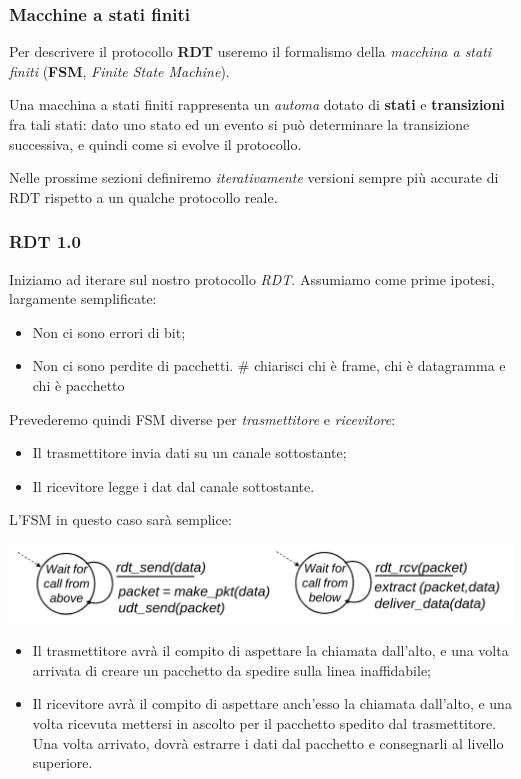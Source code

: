 \documentclass[a4paper,11pt]{article}
\begin{document}
\subsubsection{Macchine a stati finiti}
Per descrivere il protocollo \textbf{RDT} useremo il formalismo della \textit{macchina a stati finiti} (\textbf{FSM}, \textit{Finite State Machine}).

Una macchina a stati finiti rappresenta un \textit{automa} dotato di \textbf{stati} e \textbf{transizioni} fra tali stati: dato uno stato ed un evento si può determinare la transizione successiva, e quindi come si evolve il protocollo. 

\par\smallskip

Nelle prossime sezioni definiremo \textit{iterativamente} versioni sempre più accurate di RDT rispetto a un qualche protocollo reale.

\subsubsection{RDT 1.0}
Iniziamo ad iterare sul nostro protocollo \textit{RDT}.
Assumiamo come prime ipotesi, largamente semplificate:
\begin{itemize}
	\item Non ci sono errori di bit;
	\item Non ci sono perdite di pacchetti. # chiarisci chi è frame, chi è datagramma e chi è pacchetto
\end{itemize}

Prevederemo quindi FSM diverse per \textit{trasmettitore} e \textit{ricevitore}:
\begin{itemize}
	\item Il trasmettitore invia dati su un canale sottostante;
	\item Il ricevitore legge i dat dal canale sottostante.
\end{itemize}

L'FSM in questo caso sarà semplice:
\begin{center}
	\includegraphics[scale=0.16]{../figures/rdt1fsm.png}
\end{center}
\begin{itemize}
	\item Il trasmettitore avrà il compito di aspettare la chiamata dall'alto, e una volta arrivata di creare un pacchetto da spedire sulla linea inaffidabile;
	\item Il ricevitore avrà il compito di aspettare anch'esso la chiamata dall'alto, e una volta ricevuta mettersi in ascolto per il pacchetto spedito dal trasmettitore. Una volta arrivato, dovrà estrarre i dati dal pacchetto e consegnarli al livello superiore.
\end{itemize}
\end{document}
